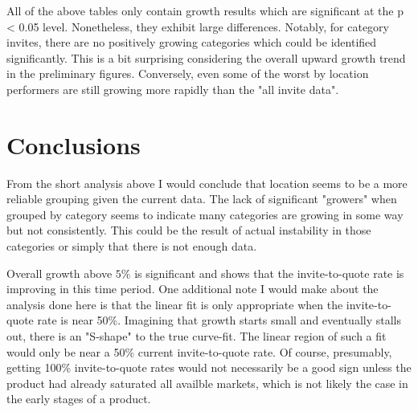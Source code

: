 \documentclass{article}[12pt]
\begin{document}
All of the above tables only contain growth results which are significant at the p < 0.05 level.
Nonetheless, they exhibit large differences. Notably, for category invites, there are no 
positively growing categories which could be identified significantly. This is a bit surprising
considering the overall upward growth trend in the preliminary figures. Conversely, even some of the worst by location performers are still growing more rapidly than the "all invite data".

\section{Conclusions}

From the short analysis above I would conclude that location seems to be a more reliable
grouping given the current data. The lack of significant "growers" when grouped by category seems to
indicate many categories are growing in some way but not consistently. This could be the result of
actual instability in those categories or simply that there is not enough data.

Overall growth above $5\%$ is significant and shows that the invite-to-quote rate is improving in this time period. One additional note I would make about the analysis done here is that the linear fit is only appropriate when the invite-to-quote rate is near 50\%. Imagining that growth starts small and eventually stalls out, there is an "S-shape" to the true curve-fit. The linear region of such a fit would only be near a 50\% current invite-to-quote rate. Of course, presumably, getting 100\% invite-to-quote rates would not necessarily be a good sign unless the product had already saturated all availble markets, which is not likely the case in the early stages of a product.
\end{document}

